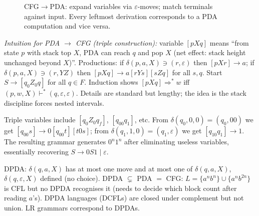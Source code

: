 \begin{figure}[h]
\centering
{}
\caption{CFG$\to$PDA: expand variables via $\varepsilon$-moves; match terminals against input. Every leftmost derivation corresponds to a PDA computation and vice versa.}
\label{fig:cfg-to-pda}
\end{figure}

\emph{Intuition for PDA $\to$ CFG (triple construction):} variable $[pXq]$ means ``from state $p$ with stack top $X$, PDA can reach $q$ and pop $X$ (net effect: stack height unchanged beyond $X$)''. Productions: if $\delta(p,a,X)\ni(r,\varepsilon)$ then $[pXr]\to a$; if $\delta(p,a,X)\ni(r,YZ)$ then $[pXq]\to a[rY s][sZq]$ for all $s,q$. Start $S\to[q_0Z_0q]$ for all $q\in F$. Induction shows $[pXq]\Rightarrow^*w$ iff $(p,w,X)\vdash^*(q,\varepsilon,\varepsilon)$. Details are standard but lengthy; the idea is the stack discipline forces nested intervals.

\begin{example}
Triple variables include $[q_0Z_0q_f]$, $[q_00q_1]$, etc. From $\delta(q_0,0,0)=(q_0,00)$ we get $[q_00s]\to0[q_00t][t0s]$; from $\delta(q_1,1,0)=(q_1,\varepsilon)$ we get $[q_10q_1]\to1$. The resulting grammar generates $0^n1^n$ after eliminating useless variables, essentially recovering $S\to0S1\mid\varepsilon$.
\end{example}

\begin{remark}[Determinism]
DPDA: $\delta(q,a,X)$ has at most one move and at most one of $\delta(q,a,X)$, $\delta(q,\varepsilon,X)$ defined (no choice). DPDA $\subsetneq$ PDA $=$ CFG: $L=\{a^nb^n\}\cup\{a^nb^{2n}\}$ is CFL but no DPDA recognises it (needs to decide which block count after reading $a$'s). DPDA languages (DCFLs) are closed under complement but not union. LR grammars correspond to DPDAs.
\end{remark}

